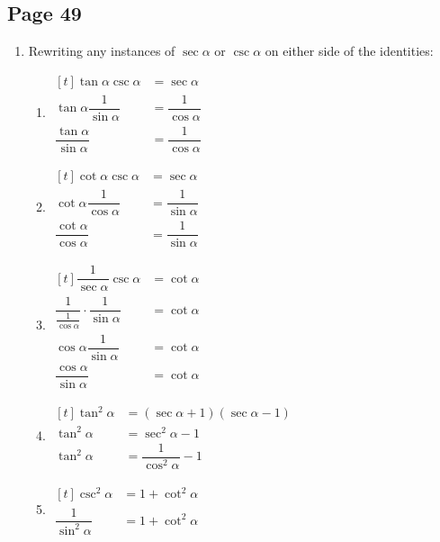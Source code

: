 \documentclass{article}
\newenvironment{solutions}[1]
{\subsection*{#1}
 \begin{enumerate}[leftmargin=1.5em]}
{\end{enumerate}}
\newcommand{\solution}{\item}
\newenvironment{subsolutions}
{\begin{enumerate}}
{\end{enumerate}}
\newcommand{\subsolution}{\item}
\begin{document}
\begin{solutions}{Page 49}

\solution %

Rewriting any instances of $\sec{\alpha}$ or $\csc{\alpha}$ on either side of the identities:

\begin{subsolutions}

\subsolution %
$\begin{aligned}[t]
\tan{\alpha}\csc{\alpha} &= \sec{\alpha} \\
\tan{\alpha}\dfrac{1}{\sin{\alpha}} &= \dfrac{1}{\cos{\alpha}} \\[1ex]
\dfrac{\tan{\alpha}}{\sin{\alpha}} &= \dfrac{1}{\cos{\alpha}}
\end{aligned}$

\subsolution %
$\begin{aligned}[t]
\cot{\alpha}\csc{\alpha} &= \sec{\alpha} \\
\cot{\alpha}\dfrac{1}{\cos{\alpha}} &= \dfrac{1}{\sin{\alpha}} \\[1ex]
\dfrac{\cot{\alpha}}{\cos{\alpha}} &= \dfrac{1}{\sin{\alpha}}
\end{aligned}$

\subsolution %
$\begin{aligned}[t]
\dfrac{1}{\sec{\alpha}}\csc{\alpha} &= \cot{\alpha} \\
\dfrac{1}{\frac{1}{\cos{\alpha}}}\cdot\dfrac{1}{\sin{\alpha}} &= \cot{\alpha} \\
\cos{\alpha}\dfrac{1}{\sin{\alpha}} &= \cot{\alpha} \\[1ex]
\dfrac{\cos{\alpha}}{\sin{\alpha}} &= \cot{\alpha}
\end{aligned}$

\subsolution %
$\begin{aligned}[t]
\tan^{2}{\alpha} &= (\sec{\alpha} + 1)(\sec{\alpha} - 1) \\
\tan^{2}{\alpha} &= \sec^{2}{\alpha} - 1 \\
\tan^{2}{\alpha} &= \dfrac{1}{\cos^{2}{\alpha}} - 1
\end{aligned}$

\subsolution %
$\begin{aligned}[t]
\csc^{2}{\alpha} &= 1 + \cot^{2}{\alpha} \\
\dfrac{1}{\sin^{2}{\alpha}} &= 1 + \cot^{2}{\alpha}
\end{aligned}$

\end{subsolutions}



\end{solutions}
\end{document}
